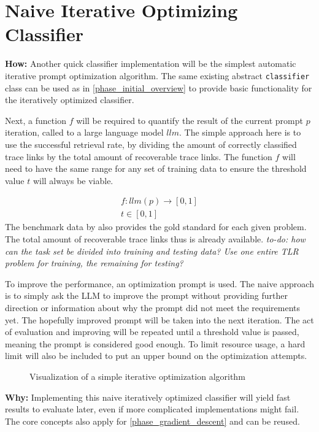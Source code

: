 \section{Naive Iterative Optimizing Classifier}
\label{approach:sec:naive_iterative}
\textbf{How:} Another quick classifier implementation will be the simplest automatic iterative prompt optimization algorithm. The same existing abstract \verb|classifier| class can be used as in \ref{phase_initial_overview} to provide basic functionality for the iteratively optimized classifier.

Next, a function $f$ will be required to quantify the result of the current prompt $p$ iteration, called to a large language model $llm$. The simple approach here is to use the successful retrieval rate, by dividing the amount of correctly classified trace links by the total amount of recoverable trace links.
The function $f$ will need to have the same range for any set of training data to ensure the threshold value $t$ will always be viable.


\begin{align*} 
f: llm(p) \rightarrow [0, 1] \\
t \in [0, 1]
\end{align*}
The benchmark data by  also provides the gold standard for each given problem. The total amount of recoverable trace links thus is already available. \textit{to-do: how can the task set be divided into training and testing data? Use one entire TLR problem for training, the remaining for testing?}

To improve the performance, an optimization prompt is used. The naive approach is to simply ask the LLM to improve the prompt without providing further direction or information about why the prompt did not meet the requirements yet. The hopefully improved prompt will be taken into the next iteration. The act of evaluation and improving will be repeated until a threshold value is passed, meaning the prompt is considered good enough. To limit resource usage, a hard limit will also be included to put an upper bound on the optimization attempts.

\begin{figure}
    \centering
    
    \caption{Visualization of a simple iterative optimization algorithm}
    \label{fig:iterative_core_loop}
\end{figure}

\textbf{Why:} Implementing this naive iteratively optimized classifier will yield fast results to evaluate later, even if more complicated implementations might fail. The core concepts also apply for \ref{phase_gradient_descent} and can be reused. 


